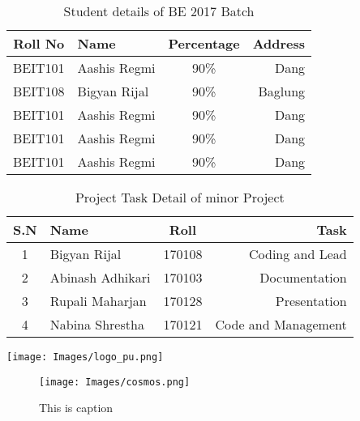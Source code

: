 \documentclass [12pt]{report}
\begin{document}
\begin{table}
    \centering
    \caption{Student details of BE 2017 Batch}
    \vspace{8pt}
    \begin{tabular}{|c|l|c|r|}
        \hline
        Roll No & Name & Percentage & Address\\
        \hline
        BEIT101 & Aashis Regmi & 90\% & Dang\\
        BEIT108 & Bigyan Rijal & 90\% & Baglung\\
        BEIT101 & Aashis Regmi & 90\% & Dang\\
        BEIT101 & Aashis Regmi & 90\% & Dang\\
        BEIT101 & Aashis Regmi & 90\% & Dang\\
        \hline
    \end{tabular}
\end{table}
\pagebreak
\begin{table}
    \centering
    \caption{Project Task Detail of minor Project}
    \begin{tabular}{|c|l|c|r|}
        \hline
        S.N & Name & Roll & Task\\
        \hline
        1 & Bigyan Rijal & 170108 & Coding and Lead\\
        \hline
        2 & Abinash Adhikari & 170103 & Documentation\\
        \hline
        3 & Rupali Maharjan & 170128 & Presentation\\
        \hline
        4 & Nabina Shrestha & 170121 & Code and Management\\
        \hline
    \end{tabular}
\end{table}
\texttt{[image: Images/logo\_pu.png]}
\begin{figure}[htb]
    \centering
    \texttt{[image: Images/cosmos.png]}
    \caption[College]{This is caption}
\end{figure}
\end{document}
